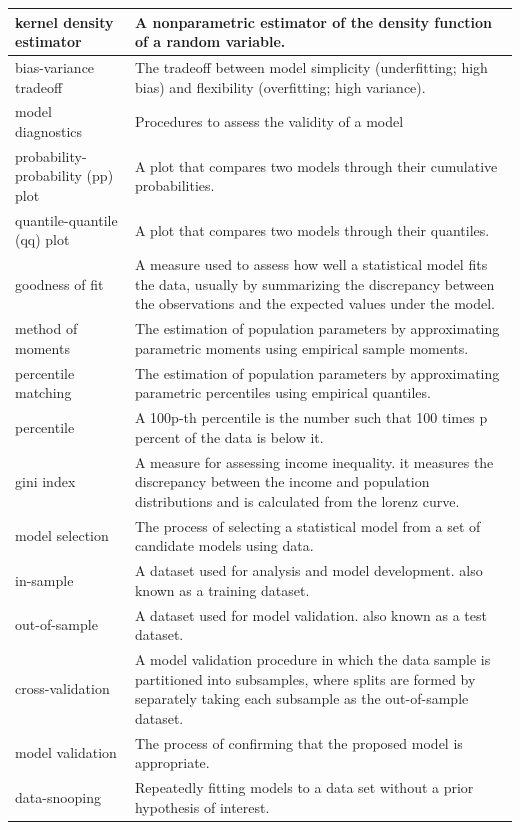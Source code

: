 \documentclass[
]{book}
\begin{document}
\begin{longtable}{>{\raggedright\arraybackslash}p{10em}|>{\raggedright\arraybackslash}p{30em}}
\hline
kernel density estimator & A nonparametric estimator of the density function of a random variable.\\
\hline
bias-variance tradeoff & The tradeoff between model simplicity (underfitting; high bias) and flexibility (overfitting; high variance).\\
\hline
model diagnostics & Procedures to assess the validity of a model\\
\hline
probability-probability (pp) plot & A plot that compares two models through their cumulative probabilities.\\
\hline
quantile-quantile (qq) plot & A plot that compares two models through their quantiles.\\
\hline
goodness of fit & A measure used to assess how well a statistical model fits the data, usually by summarizing the discrepancy between the observations and the expected values under the model.\\
\hline
method of moments & The estimation of population parameters by approximating parametric moments using empirical sample moments.\\
\hline
percentile matching & The estimation of population parameters by approximating parametric percentiles using empirical quantiles.\\
\hline
percentile & A 100p-th percentile is the number such that 100 times p percent of the data is below it.\\
\hline
gini index & A measure for assessing income inequality. it measures the discrepancy between the income and population distributions and is calculated from the lorenz curve.\\
\hline
model selection & The process of selecting a statistical model from a set of candidate models using data.\\
\hline
in-sample & A dataset used for analysis and model development. also known as a training dataset.\\
\hline
out-of-sample & A dataset used for model validation. also known as a test dataset.\\
\hline
cross-validation & A model validation procedure in which the data sample is partitioned into subsamples, where splits are formed by separately taking each subsample as the out-of-sample dataset.\\
\hline
model validation & The process of confirming that the proposed model is appropriate.\\
\hline
data-snooping & Repeatedly fitting models to a data set without a prior hypothesis of interest.\\

\end{longtable}
\end{document}
